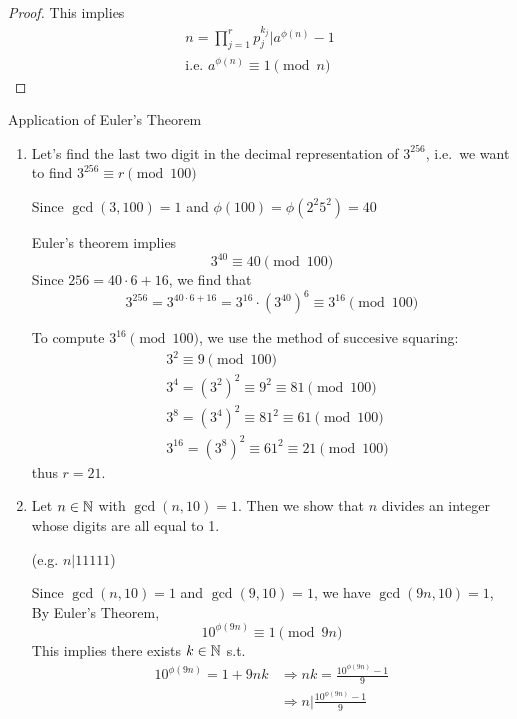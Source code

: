 \begin{proof}
    This implies
    \[
        \begin{aligned}
            n = \prod_{j=1}^{r}{p_j^{k_j}} | a^{\phi(n)} - 1 \\
            \text{i.e. } a^{\phi(n)} \equiv 1 \pmod n
        \end{aligned}
    \]
\end{proof}

\begin{eg}
    Application of Euler's Theorem

    \begin{enumerate}
        \item Let's find the last two digit in the decimal representation of $3^{256}$,
        i.e.\ we want to find $3^{256} \equiv r \pmod {100}$

        Since $\gcd(3, 100) = 1$ and $\phi(100) = \phi(2^2 5^2) = 40$

        Euler's theorem implies 
        \[
            3^{40} \equiv 40 \pmod {100}
        \]
        Since $256 = 40\cdot6+16$, we find that
        \[
            3^{256} = 3^{40\cdot6+16}=3^{16}\cdot{(3^{40})}^6 \equiv 3^{16} \pmod {100}
        \]

        To compute $3^{16}\pmod{100}$, we use the method of succesive squaring:
        \[
            \begin{aligned}
                &3^2 \equiv 9 \pmod{100} \\
                &3^4={(3^2)}^2\equiv9^2\equiv81\pmod{100} \\
                &3^8={(3^4)}^2\equiv81^2\equiv61\pmod{100} \\
                &3^{16}={(3^8)}^2\equiv61^2\equiv21\pmod{100}
            \end{aligned}
        \]
        thus $r = 21$.

        \item Let $n \in \mathbb{N}$ with $\gcd(n, 10) = 1$.
        Then we show that $n$ divides an integer whose digits are all equal to 1.

        (e.g. $n|11111$)

        Since $\gcd(n, 10) = 1$ and $\gcd(9, 10) = 1$,
        we have $\gcd(9n, 10) = 1$, By Euler's Theorem,
        \[
            10^{\phi(9n)} \equiv 1 \pmod{9n}
        \]
        This implies there exists $k \in \mathbb{N}$ s.t.
        \[
            \begin{aligned}
                10^{\phi(9n)} = 1 + 9nk &\Rightarrow nk = \frac{10^{\phi(9n)} - 1}{9} \\
                &\Rightarrow n | \frac{10^{\phi(9n)}-1}{9}
            \end{aligned}
        \]


\end{enumerate}
\end{eg}
